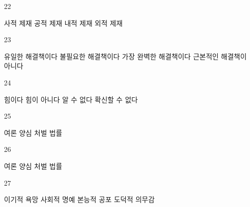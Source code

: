 \documentclass[fs9,seriesRus]{korfarm-base}
\begin{document}
\begin{kfSentenceUnit}{22}{}
\begin{kfChoices}
\kfChoice 사적 제재
\kfChoice 공적 제재
\kfChoice 내적 제재
\kfChoice 외적 제재
\end{kfChoices}
\end{kfSentenceUnit}

\begin{kfSentenceUnit}{23}{}
\begin{kfChoices}
\kfChoice 유일한 해결책이다
\kfChoice 불필요한 해결책이다
\kfChoice 가장 완벽한 해결책이다
\kfChoice 근본적인 해결책이 아니다
\end{kfChoices}
\end{kfSentenceUnit}

\begin{kfSentenceUnit}{24}{}
\begin{kfChoices}
\kfChoice 힘이다
\kfChoice 힘이 아니다
\kfChoice 알 수 없다
\kfChoice 확신할 수 없다
\end{kfChoices}
\end{kfSentenceUnit}

\begin{kfSentenceUnit}{25}{}
\begin{kfChoices}
\kfChoice 여론
\kfChoice 양심
\kfChoice 처벌
\kfChoice 법률
\end{kfChoices}
\end{kfSentenceUnit}

\begin{kfSentenceUnit}{26}{}
\begin{kfChoices}
\kfChoice 여론
\kfChoice 양심
\kfChoice 처벌
\kfChoice 법률
\end{kfChoices}
\end{kfSentenceUnit}

\begin{kfSentenceUnit}{27}{}
\begin{kfChoices}
\kfChoice 이기적 욕망
\kfChoice 사회적 명예
\kfChoice 본능적 공포
\kfChoice 도덕적 의무감
\end{kfChoices}
\end{kfSentenceUnit}
\end{document}
